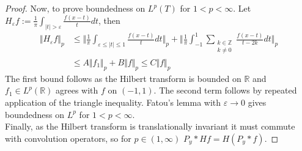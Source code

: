 \documentclass[10pt,a4paper]{amsart}
\newcommand{\R}{\mathbb{R}}
\newcommand{\Z}{\mathbb{Z}}
\newcommand{\eps}{\varepsilon}
\begin{document}
\begin{proof}
    Now, to prove boundedness on $L^p(T)$ for $1 < p < \infty$. Let $H_\eps f :=  
	\frac{1}{\pi} \int_{|t| > \eps} \frac{ f(x-t)}{t}dt$, then
    \begin{align*}
        \Vert H_\eps  f\Vert_p &\leq \bigg\Vert \frac{1}{\pi} \int_{\eps \leq |t| \leq 1} 
	    \frac{ f(x-t)}{t}dt \bigg \Vert_p + 
        \bigg\Vert \frac{1}{\pi}\int_{-1}^1 \sum_{\substack{k\in\Z\\k\neq0}}
	    \frac{ f(x-t)}{t-2k}dt\bigg\Vert_p  \\ &\leq A\Vert f_1\Vert_p + B \Vert  
	    f\Vert_p \leq C\Vert f\Vert_p 
    \end{align*}
    The first bound follows as the Hilbert transform is bounded on $\R$ and $f_1\in L^p(\R)$ agrees 
	with $f$ on $(-1, 1)$. The second term follows by repeated application of the triangle 
	inequality. Fatou's lemma with $\eps \to 0$ gives boundedness on $L^p$ 
	for $1 < p < \infty$. \\

    Finally, as the Hilbert transform is translationally invariant it must commute with 
	convolution operators, so for $p\in(1, \infty)$ $P_y\ast Hf = H (P_y \ast f)$.
\end{proof}
\end{document}
